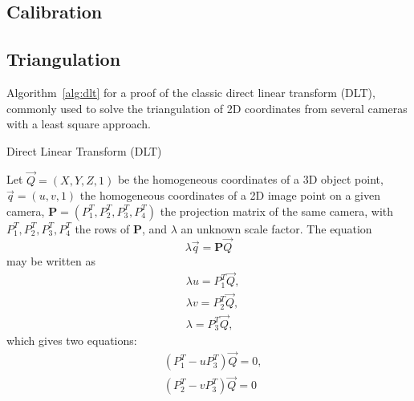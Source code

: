 \subsection{Calibration}

\cite{Marchand2015}


\subsection{Triangulation}\label{triangulation}

Algorithm~\ref{alg:dlt} for a proof of the classic direct linear transform (DLT), commonly used to solve the triangulation of 2D coordinates from several cameras with a least square approach.


\begin{algorithm}[!ht]
      \caption{Direct Linear Transform (DLT)}\label{alg:dlt}
      \begin{algorithmic}[1]
          \STATEx Let \(\overrightarrow{Q} = (X, Y, Z, 1)\) be the homogeneous coordinates of a 3D object point, 
          \STATEx \(\overrightarrow{q} = (u, v, 1)\) the homogeneous coordinates of a 2D image point on a given camera,
          \STATEx \(\textbf{P} = (P_1^T, P_2^T, P_3^T, P_4^T)\) the projection matrix of the same camera, with \(P_1^T, P_2^T, P_3^T, P_4^T\) the rows of \textbf{P}, and \(\lambda\) an unknown scale factor. 
          \STATE The equation
            \begin{equation}
              \lambda \overrightarrow{q} = \bm{P} \overrightarrow{Q}
            \end{equation}
            may be written as
            \begin{equation}
              \begin{aligned}
              &\lambda u = P_1^T \overrightarrow{Q},\\
              &\lambda v = P_2^T \overrightarrow{Q},\\
              &\lambda = P_3^T \overrightarrow{Q},
              \end{aligned}
            \end{equation}
            which gives two equations:
            \begin{equation}\label{eq:dlt}
              \begin{aligned}
              &(P_1^T - u P_3^T) \overrightarrow{Q} = 0,\\
              &(P_2^T - v P_3^T) \overrightarrow{Q} = 0
              \end{aligned}

\end{equation}
\end{algorithmic}
\end{algorithm}
